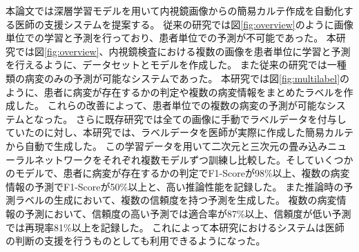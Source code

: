 本論文では深層学習モデルを用いて内視鏡画像からの簡易カルテ作成を自動化する医師の支援システムを提案する。
従来の研究では図\ref{fig:overview}のように画像単位での学習と予測を行っており、患者単位での予測が不可能であった。
本研究では図\ref{fig:overview}、内視鏡検査における複数の画像を患者単位に学習と予測を行えるように、データセットとモデルを作成した。
また従来の研究では一種類の病変のみの予測が可能なシステムであった。
本研究では図\ref{fig:multilabel}のように、患者に病変が存在するかの判定や複数の病変情報をまとめたラベルを作成した。
これらの改善によって、患者単位での複数の病変の予測が可能なシステムとなった。
さらに既存研究では全ての画像に手動でラベルデータを付与していたのに対し、本研究では、ラベルデータを医師が実際に作成した簡易カルテから自動で生成した。
この学習データを用いて二次元と三次元の畳み込みニューラルネットワークをそれぞれ複数モデルずつ訓練し比較した。そしていくつかのモデルで、患者に病変が存在するかの判定でF1-Scoreが98\%以上、複数の病変情報の予測でF1-Scoreが50\%以上と、高い推論性能を記録した。
また推論時の予測ラベルの生成において、複数の信頼度を持つ予測を生成した。
複数の病変情報の予測において、信頼度の高い予測では適合率が87\%以上、信頼度が低い予測では再現率81\%以上を記録した。
これによって本研究におけるシステムは医師の判断の支援を行うものとしても利用できるようになった。
